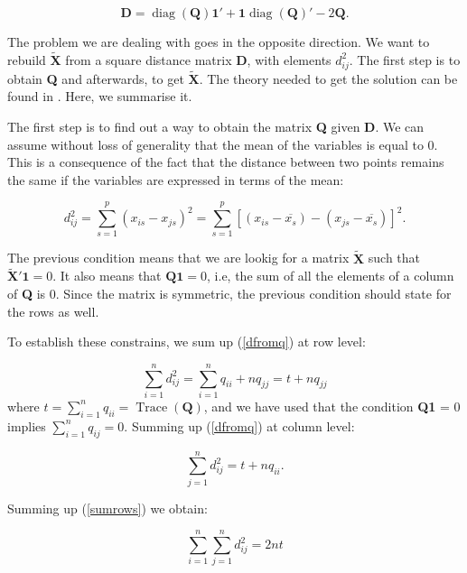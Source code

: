 \documentclass[11pt]{report}
\DeclareMathOperator{\Tr}{Trace}
\DeclareMathOperator{\diag}{diag}
\begin{document}
\[
\mathbf{D} = \diag(\mathbf{Q}) \mathbf{1}' + \mathbf{1}\diag(\mathbf{Q})' - 2\mathbf{Q}.
\]

\indent The problem we are dealing with goes in the opposite direction. We want 
to rebuild $\mathbf{\widetilde{X}}$ from a square distance matrix \textbf{D}, 
with elements $d_{ij}^2$. The first step is to obtain \textbf{Q} and afterwards, 
to get $\mathbf{\widetilde{X}}$. The theory needed to get the solution can be 
found in \cite{pena_libro}. Here, we summarise it.

\indent The first step is to find out a way to obtain the matrix \textbf{Q} 
given \textbf{D}. We can assume without loss of generality that the mean of 
the variables is equal to 0. This is a consequence of the fact that the distance 
between two points remains the same if the variables are expressed in terms 
of the mean:


\begin{equation} \label{dtraslated}
d_{ij}^2 = \sum_{s = 1}^p (x_{is} - x_{js})^2 = \sum_{s=1} ^p [(x_{is} - \overline{x_s})- (x_{js} - \overline{x_s})]^2.
\end{equation}

\indent The previous condition means that we are lookig for a matrix  
$\mathbf{\widetilde{X}}$ such that $\mathbf{\widetilde{X}'}\mathbf{1} = 0$. 
It also means that $\mathbf{Q}\mathbf{1} = 0$, i.e, the sum of all the elements 
of a column of \textbf{Q} is 0. Since the matrix is symmetric, the previous 
condition should state for the rows as well. 

\indent To establish these constrains, we sum up (\ref{dfromq}) at row level:

\begin{equation} \label{sumrows}
\sum_{i = 1}^n d_{ij}^2 = \sum_{i = 1}^n q_{ii} + nq_{jj} = t + nq_{jj}
\end{equation}
where $t = \sum_{i = 1}^n q_{ii} = \Tr(\mathbf{Q})$, and we have used that the
condition \textbf{Q}\textbf{1} = 0 implies $\sum_{i = 1}^n q_{ij} = 0$. Summing 
up (\ref{dfromq}) at column level:

\begin{equation} \label{sumcols}
\sum_{j = 1}^n d_{ij}^2 = t + nq_{ii}.
\end{equation}

\indent Summing up (\ref{sumrows}) we obtain:

\begin{equation} \label{doublesum}
\sum_{i = 1}^n\sum_{j = 1}^n d_{ij}^2 = 2nt
\end{equation}
\end{document}
